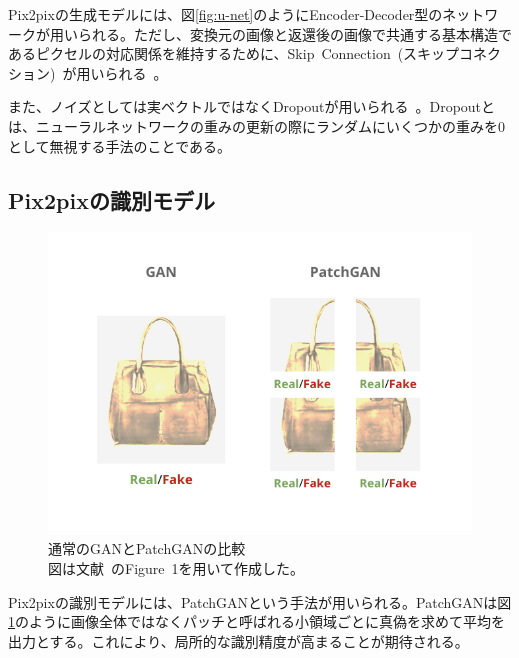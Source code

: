 Pix2pixの生成モデルには、図\ref{fig:u-net}のようにEncoder-Decoder型のネットワークが用いられる。ただし、変換元の画像と返還後の画像で共通する基本構造であるピクセルの対応関係を維持するために、Skip~Connection~(スキップコネクション)~が用いられる~\cite{u-net}。


また、ノイズとしては実ベクトルではなくDropoutが用いられる~\cite{Dropout}。Dropoutとは、ニューラルネットワークの重みの更新の際にランダムにいくつかの重みを0として無視する手法のことである。

\subsection{Pix2pixの識別モデル}

\begin{figure}[t]
\begin{center}
\includegraphics[width=0.95\hsize]{figure/patchgan.png}
\caption{通常のGANとPatchGANの比較\\
図は文献~\cite{pix2pix}のFigure~1を用いて作成した。}
\label{fig:patchgan}
\end{center}
\end{figure}

Pix2pixの識別モデルには、PatchGANという手法が用いられる。PatchGANは図\ref{fig:patchgan}のように画像全体ではなくパッチと呼ばれる小領域ごとに真偽を求めて平均を出力とする。これにより、局所的な識別精度が高まることが期待される。